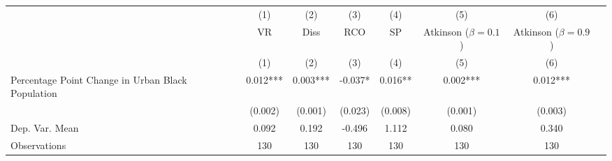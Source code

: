 \begin{tabular}{l*{7}{c}} \toprule
                &\multicolumn{1}{c}{(1)}   &\multicolumn{1}{c}{(2)}   &\multicolumn{1}{c}{(3)}   &\multicolumn{1}{c}{(4)}   &\multicolumn{1}{c}{(5)}   &\multicolumn{1}{c}{(6)}   \\
&\multicolumn{1}{c}{VR}&\multicolumn{1}{c}{Diss}&\multicolumn{1}{c}{RCO}&\multicolumn{1}{c}{SP}&\multicolumn{1}{c}{Atkinson ($\beta = 0.1$)}&\multicolumn{1}{c}{Atkinson ($\beta = 0.9$)}\\\cmidrule(lr){2-2}\cmidrule(lr){3-3}\cmidrule(lr){4-4}\cmidrule(lr){5-5}\cmidrule(lr){6-6}\cmidrule(lr){7-7}
&\multicolumn{1}{c}{(1)}&\multicolumn{1}{c}{(2)}&\multicolumn{1}{c}{(3)}&\multicolumn{1}{c}{(4)}&\multicolumn{1}{c}{(5)}&\multicolumn{1}{c}{(6)}\\
\cmidrule(lr){1-7}
Percentage Point Change in Urban Black Population&    0.012***&    0.003***&   -0.037*  &    0.016** &    0.002***&    0.012***\\
                &  (0.002)   &  (0.001)   &  (0.023)   &  (0.008)   &  (0.001)   &  (0.003)   \\
\midrule
Dep. Var. Mean  &    0.092   &    0.192   &   -0.496   &    1.112   &    0.080   &    0.340   \\
Observations    &      130   &      130   &      130   &      130   &      130   &      130   \\
       \bottomrule \end{tabular}

